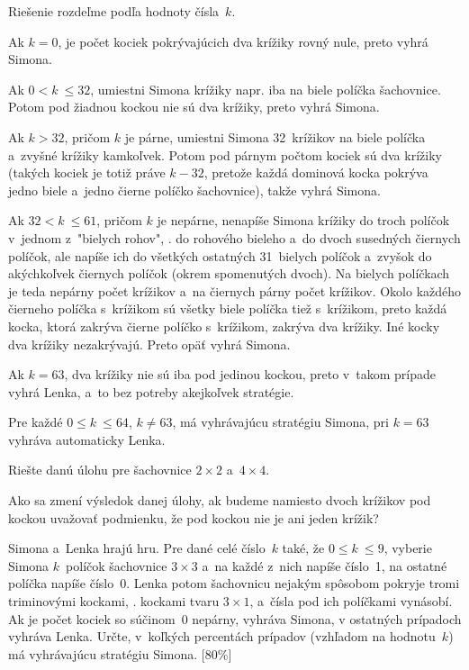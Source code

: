 {%
Riešenie rozdeľme podľa hodnoty čísla~$k$.

Ak $k = 0$, je počet kociek pokrývajúcich dva krížiky rovný nule, preto vyhrá
Simona.

Ak $0 < k~\le 32$, umiestni Simona krížiky napr. iba na biele políčka šachovnice. Potom pod
žiadnou kockou nie sú dva krížiky, preto vyhrá Simona.

Ak $k > 32$, pričom $k$ je párne, umiestni Simona 32~krížikov na biele políčka a~zvyšné krížiky kamkoľvek.
Potom pod párnym počtom kociek sú dva krížiky (takých kociek je totiž práve $k-32$,
pretože každá dominová kocka pokrýva jedno biele a~jedno čierne políčko šachovnice),
takže vyhrá Simona.

Ak $32 < k~\le 61$, pričom $k$ je nepárne, nenapíše Simona krížiky do troch políčok v~jednom z~"bielych rohov",
\tj. do rohového bieleho a~do dvoch susedných čiernych políčok, ale napíše ich do všetkých
ostatných 31~bielych políčok a~zvyšok do akýchkoľvek čiernych políčok (okrem spomenutých dvoch). Na bielych
políčkach je teda nepárny počet krížikov a~na čiernych párny počet krížikov. Okolo každého
čierneho políčka s~krížikom sú všetky biele políčka tiež s~krížikom, preto každá kocka,
ktorá zakrýva čierne políčko s~krížikom, zakrýva dva krížiky. Iné kocky dva krížiky
nezakrývajú. Preto opäť vyhrá Simona.

Ak $k = 63$, dva krížiky nie sú iba pod jedinou kockou, preto v~takom prípade
vyhrá Lenka, a~to bez potreby akejkoľvek stratégie.

\odpoved
Pre každé $0 \le k~\le 64$, $k \ne 63$, má vyhrávajúcu stratégiu Simona, pri
$k = 63$ vyhráva automaticky Lenka.



Riešte danú úlohu pre šachovnice $2\times 2$ a~$4\times 4$.

Ako sa zmení výsledok danej úlohy, ak budeme namiesto dvoch krížikov pod kockou
uvažovať podmienku, že pod kockou nie je ani jeden krížik?

Simona a~Lenka hrajú hru. Pre dané celé číslo~$k$ také, že $0 \le k~\le 9$,
vyberie Simona $k$~políčok šachovnice $3\times 3$ a~na každé z~nich napíše číslo~1, na
ostatné políčka napíše číslo~0. Lenka potom šachovnicu nejakým spôsobom pokryje tromi
triminovými kockami, \tj. kockami tvaru $3\times 1$, a~čísla pod ich políčkami
vynásobí. Ak je počet kociek so súčinom~0 nepárny, vyhráva Simona, v ostatných prípadoch vyhráva Lenka.
Určte, v~koľkých percentách prípadov (vzhľadom na hodnotu~$k$) má vyhrávajúcu stratégiu Simona. [80\%]%
}

